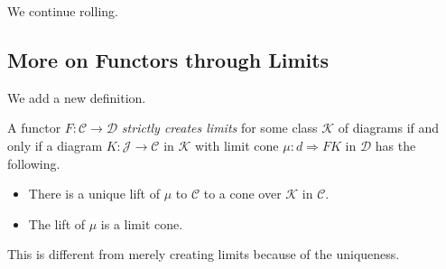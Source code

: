 
We continue rolling.

\subsection{More on Functors through Limits}
We add a new definition.
\begin{definition}
	A functor $F:\mathcal C\to\mathcal D$ \textit{strictly creates limits} for some class $\mathcal K$ of diagrams if and only if a diagram $K:\mathcal J\to\mathcal C$ in $\mathcal K$ with limit cone $\mu:d\Rightarrow FK$ in $\mathcal D$ has the following.
	\begin{itemize}
		\item There is a unique lift of $\mu$ to $\mathcal C$ to a cone over $\mathcal K$ in $\mathcal C$.
		\item The lift of $\mu$ is a limit cone.
	\end{itemize}
\end{definition}
This is different from merely creating limits because of the uniqueness.

